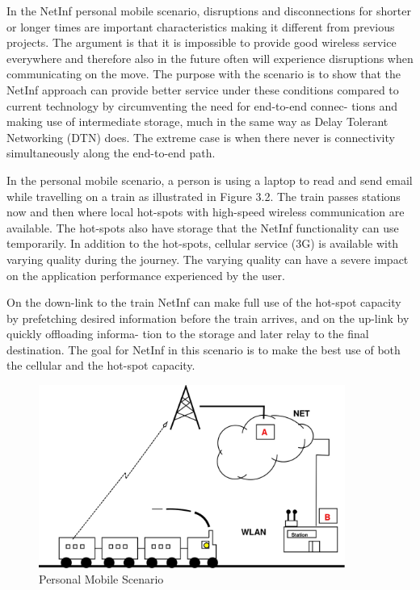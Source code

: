 In the NetInf personal mobile scenario, disruptions and disconnections for shorter or longer
times are important characteristics making it different from previous projects. The argument is
that it is impossible to provide good wireless service everywhere and therefore also in
the future often will experience disruptions when communicating on the move. The purpose
with the scenario is to show that the NetInf approach can provide better service under these
conditions compared to current technology by circumventing the need for end-to-end connec-
tions and making use of intermediate storage, much in the same way as Delay Tolerant
Networking (DTN) does. The extreme case is when there never is connectivity simultaneously
along the end-to-end path.

In the personal mobile scenario, a person is using a laptop to read and send email while
travelling on a train as illustrated in Figure 3.2. The train passes stations now and then where
local hot-spots with high-speed wireless communication are available. The hot-spots also
have storage that the NetInf functionality can use temporarily. In addition to the hot-spots,
cellular service (3G) is available with varying quality during the journey. The varying quality
can have a severe impact on the application performance experienced by the user.

On the down-link to the train NetInf can make full use of the hot-spot capacity by prefetching
desired information before the train arrives, and on the up-link by quickly offloading informa-
tion to the storage and later relay to the final destination. The goal for NetInf in this scenario is
to make the best use of both the cellular and the hot-spot capacity.


\begin{figure}[h]
 \begin{center}
 \includegraphics[height=6cm]{5.jpg}
 \caption{Personal Mobile Scenario}
 \end{center}
 \end{figure}

